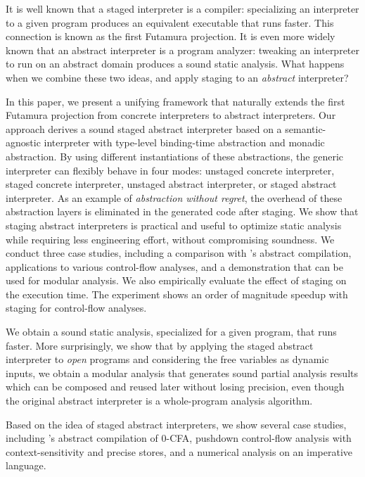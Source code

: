 It is well known that a staged interpreter is a compiler: specializing an
interpreter to a given program produces an equivalent executable that runs faster.
This connection is known as the first Futamura projection.
It is even more widely known that an abstract interpreter is a program analyzer:
tweaking an interpreter to run on an abstract domain produces a sound static
analysis. What happens when we combine these two ideas, and apply staging to
an \emph{abstract} interpreter?

In this paper, we present a unifying framework that naturally extends the first
Futamura projection from concrete interpreters to abstract interpreters. Our
approach derives a sound staged abstract interpreter based on a
semantic-agnostic interpreter with type-level binding-time abstraction and
monadic abstraction. By using different instantiations of these abstractions,
the generic interpreter can flexibly behave in four modes: unstaged concrete
interpreter, staged concrete interpreter, unstaged abstract interpreter, or
staged abstract interpreter. As an example of \emph{abstraction without regret},
the overhead of these abstraction layers is eliminated in the generated code
after staging. We show that staging abstract interpreters is practical and
useful to optimize static analysis while requiring less engineering effort,
without compromising soundness. We conduct three case studies, including a
comparison with \citeauthor{Boucher:1996:ACN:647473.727587}'s abstract
compilation, applications to various control-flow analyses, and a demonstration
that can be used for modular analysis. We also empirically evaluate the effect
of staging on the execution time. The experiment shows an order of magnitude
speedup with staging for control-flow analyses.

\iffalse
We obtain a sound static analysis, specialized for
a given program, that runs faster. More surprisingly, we show that by applying
the staged abstract interpreter to \textit{open} programs and considering the
free variables as dynamic inputs, we obtain a modular analysis that generates
sound partial analysis results which can be composed and reused later without
losing precision, even though the original abstract interpreter is a
whole-program analysis algorithm.

Based on the idea of staged abstract interpreters, we show several case studies,
including \citeauthor{Boucher:1996:ACN:647473.727587}'s abstract compilation of
0-CFA, pushdown control-flow analysis with context-sensitivity and precise
stores, and a numerical analysis on an imperative language.

